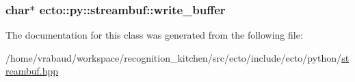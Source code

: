 \subsubsection[{\texorpdfstring{write\+\_\+buffer}{write_buffer}}]{\setlength{\rightskip}{0pt plus 5cm}char$\ast$ ecto\+::py\+::streambuf\+::write\+\_\+buffer\hspace{0.3cm}{\ttfamily [private]}}\hypertarget{classecto_1_1py_1_1streambuf_a331e541fac616ac9ac3a81fb117057c6}{}\label{classecto_1_1py_1_1streambuf_a331e541fac616ac9ac3a81fb117057c6}


The documentation for this class was generated from the following file\+:\begin{DoxyCompactItemize}
\item 
/home/vrabaud/workspace/recognition\+\_\+kitchen/src/ecto/include/ecto/python/\hyperlink{streambuf_8hpp}{streambuf.\+hpp}\end{DoxyCompactItemize}
